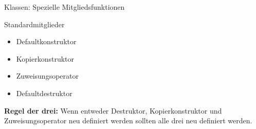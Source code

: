 \ifnum\conditionmacro=1 \documentclass[handout,usenames,dvipsnames]{beamer}\fi
\begin{document}
\begin{frame}{Klassen: Spezielle Mitgliedsfunktionen}
\begin{block}{Standardmitglieder}
\begin{itemize}
\item Defaultkonstruktor
\item Kopierkonstruktor
\item Zuweisungsoperator
\item Defaultdestruktor
\end{itemize}

\end{block}

\textbf{Regel der drei:} Wenn entweder Destruktor, Kopierkonstruktor und Zuweisungsoperator neu definiert werden sollten alle drei neu definiert werden.
\end{frame}

\end{document}
